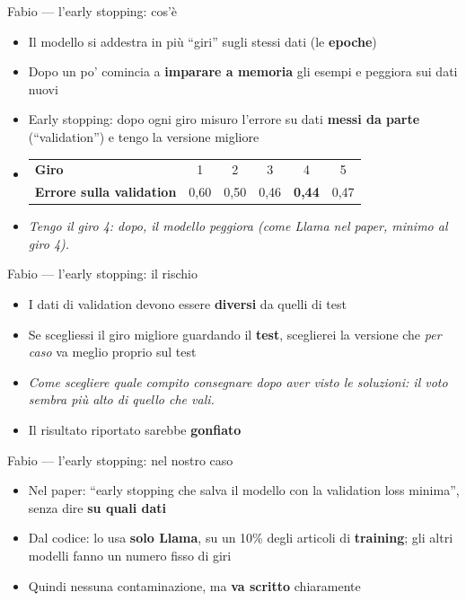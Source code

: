 \documentclass[aspectratio=169]{beamer}
\newcommand{\hl}[1]{\textbf{#1}}
\begin{document}
\begin{frame}{Fabio --- l'early stopping: cos'\`e}
  \vfill
  \begin{itemize}[<+->]
    \setlength\itemsep{0.8em}
    \item Il modello si addestra in pi\`u ``giri'' sugli stessi dati (le \hl{epoche})
    \item Dopo un po' comincia a \hl{imparare a memoria} gli esempi e peggiora sui dati nuovi
    \item Early stopping: dopo ogni giro misuro l'errore su dati \hl{messi da parte} (``validation'') e tengo la versione migliore
    \item[] {\small\begin{tabular}{lccccc}
      \toprule
      \textbf{Giro} & 1 & 2 & 3 & 4 & 5 \\
      \textbf{Errore sulla validation} & 0,60 & 0,50 & 0,46 & \hl{0,44} & 0,47 \\
      \bottomrule
    \end{tabular}}
    \item[] {\small\itshape Tengo il giro 4: dopo, il modello peggiora (come Llama nel paper, minimo al giro 4).}
  \end{itemize}
  \vfill
\end{frame}

\begin{frame}{Fabio --- l'early stopping: il rischio}
  \vfill
  \begin{itemize}[<+->]
    \setlength\itemsep{0.8em}
    \item I dati di validation devono essere \hl{diversi} da quelli di test
    \item Se scegliessi il giro migliore guardando il \hl{test}, sceglierei la versione che \emph{per caso} va meglio proprio sul test
    \item[] {\small\itshape Come scegliere quale compito consegnare dopo aver visto le soluzioni: il voto sembra pi\`u alto di quello che vali.}
    \item Il risultato riportato sarebbe \hl{gonfiato}
  \end{itemize}
  \vfill
\end{frame}

\begin{frame}{Fabio --- l'early stopping: nel nostro caso}
  \vfill
  \begin{itemize}[<+->]
    \setlength\itemsep{0.8em}
    \item Nel paper: ``early stopping che salva il modello con la validation loss minima'', senza dire \hl{su quali dati}
    \item Dal codice: lo usa \hl{solo Llama}, su un 10\% degli articoli di \hl{training}; gli altri modelli fanno un numero fisso di giri
    \item Quindi nessuna contaminazione, ma \hl{va scritto} chiaramente
  \end{itemize}
  \vfill
\end{frame}
\end{document}
